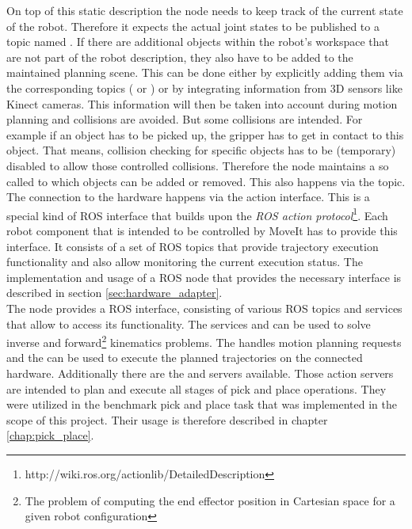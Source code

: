 On top of this static description the  node needs to keep track of the current state of the robot. Therefore it expects the actual joint states to be published to a topic named . If there are additional objects within the robot's workspace that are not part of the robot description, they also have to be added to the maintained planning scene. This can be done either by explicitly adding them via the corresponding topics ( or ) or by integrating information from 3D sensors like Kinect cameras. This information will then be taken into account during motion planning and collisions are avoided. But some collisions are intended. For example if an object has to be picked up, the gripper has to get in contact to this object. That means, collision checking for specific objects has to be (temporary) disabled to allow those controlled collisions. Therefore the  node maintains a so called  to which objects can be added or removed. This also happens via the  topic. \\

The connection to the hardware happens via the  action interface. This is a special kind of ROS interface that builds upon the \emph{ROS action protocol}\footnote{http://wiki.ros.org/actionlib/DetailedDescription}. Each robot component that is intended to be controlled by MoveIt has to provide this interface. It consists of a set of ROS topics that provide trajectory execution functionality and also allow monitoring the current execution status. The implementation and usage of a ROS node that provides the necessary interface is described in section \ref{sec:hardware_adapter}. \\

The  node provides a ROS interface, consisting of various ROS topics and services that allow to access its functionality. The services  and  can be used to solve inverse and forward\footnote{The problem of computing the end effector position in Cartesian space for a given robot configuration} kinematics problems. The  handles motion planning requests and the  can be used to execute the planned trajectories on the connected hardware. Additionally there are the  and  servers available. Those action servers are intended to plan and execute all stages of pick and place operations. They were utilized in the benchmark pick and place task that was implemented in the scope of this project. Their usage is therefore described in chapter \ref{chap:pick_place}. \\

